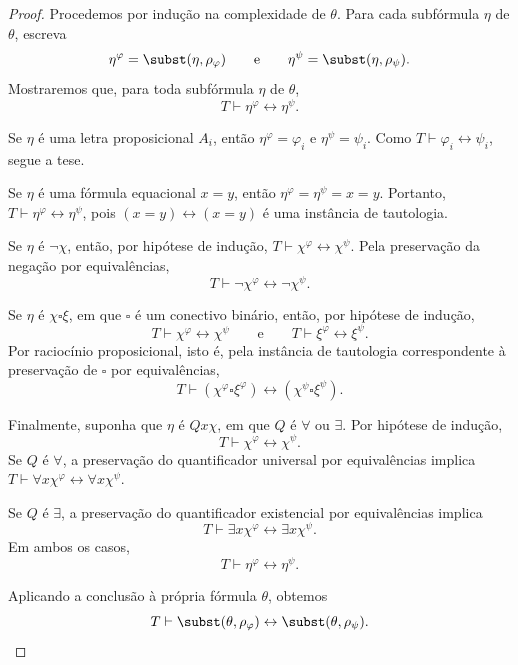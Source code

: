 \begin{proof}
    Procedemos por indução na complexidade de $\theta$.
    Para cada subfórmula $\eta$ de $\theta$, escreva
    \[
        \eta^\varphi=\subst(\eta,\rho_\varphi)
        \qquad\text{e}\qquad
        \eta^\psi=\subst(\eta,\rho_\psi).
    \]
    Mostraremos que, para toda subfórmula $\eta$ de $\theta$,
    \[
        T\vdash \eta^\varphi\leftrightarrow \eta^\psi.
    \]

    Se $\eta$ é uma letra proposicional $A_i$, então $\eta^\varphi=\varphi_i$ e $\eta^\psi=\psi_i$.
    Como $T\vdash \varphi_i\leftrightarrow\psi_i$, segue a tese.

    Se $\eta$ é uma fórmula equacional $x=y$, então $\eta^\varphi=\eta^\psi=x=y$.
    Portanto, $T\vdash \eta^\varphi\leftrightarrow\eta^\psi$, pois $(x=y)\leftrightarrow(x=y)$ é uma instância de tautologia.

    Se $\eta$ é $\neg\chi$, então, por hipótese de indução, $T\vdash \chi^\varphi\leftrightarrow\chi^\psi$.
    Pela preservação da negação por equivalências,
    \[
        T\vdash \neg\chi^\varphi\leftrightarrow\neg\chi^\psi.
    \]

    Se $\eta$ é $\chi\square\xi$, em que $\square$ é um conectivo binário, então, por hipótese de indução,
    \[
        T\vdash \chi^\varphi\leftrightarrow\chi^\psi
        \qquad\text{e}\qquad
        T\vdash \xi^\varphi\leftrightarrow\xi^\psi.
    \]
    Por raciocínio proposicional, isto é, pela instância de tautologia correspondente à preservação de $\square$ por equivalências,
    \[
        T\vdash
        (\chi^\varphi\square\xi^\varphi)
        \leftrightarrow
        (\chi^\psi\square\xi^\psi).
    \]

    Finalmente, suponha que $\eta$ é $Qx\chi$, em que $Q$ é $\forall$ ou $\exists$.
    Por hipótese de indução,
    \[
        T\vdash \chi^\varphi\leftrightarrow\chi^\psi.
    \]
    Se $Q$ é $\forall$, a preservação do quantificador universal por equivalências implica $T\vdash \forall x\chi^\varphi\leftrightarrow\forall x\chi^\psi$.

    Se $Q$ é $\exists$, a preservação do quantificador existencial por equivalências implica
    \[
        T\vdash \exists x\chi^\varphi\leftrightarrow\exists x\chi^\psi.
    \]
    Em ambos os casos,
    \[
        T\vdash \eta^\varphi\leftrightarrow\eta^\psi.
    \]

    Aplicando a conclusão à própria fórmula $\theta$, obtemos
    \[
        T\vdash \subst(\theta,\rho_\varphi)\leftrightarrow \subst(\theta,\rho_\psi).
    \]
\end{proof}

